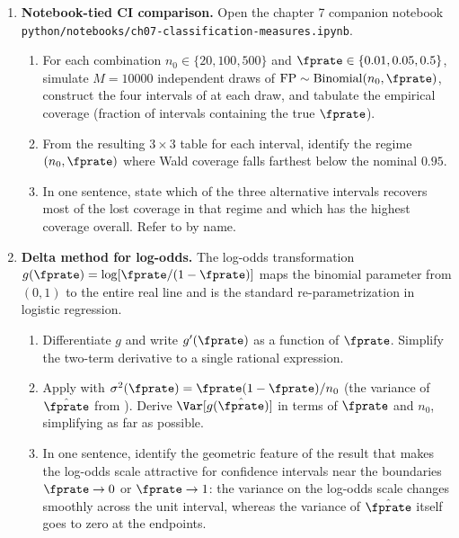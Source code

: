 \begin{enumerate}

\item \exstarstar
\label{ex:ch7-4}
\textbf{Notebook-tied CI comparison.}
Open the chapter 7 companion notebook
\texttt{python/notebooks/ch07-classification-measures.ipynb}.
\begin{enumerate}
  \item[(a)] For each combination $n_0 \in \{20, 100, 500\}$ and
    $\fprate \in \{0.01, 0.05, 0.5\}$, simulate $M = 10000$
    independent draws of $\mathrm{FP} \sim
    \mathrm{Binomial}(n_0, \fprate)$, construct the four intervals
    of 
    at each draw, and tabulate the empirical coverage (fraction
    of intervals containing the true $\fprate$).
  \item[(b)] From the resulting $3 \times 3$ table for each
    interval, identify the regime $(n_0, \fprate)$ where Wald
    coverage falls farthest below the nominal $0.95$.
  \item[(c)] In one sentence, state which of the three alternative
    intervals recovers most of the lost coverage in that regime
    and which has the highest coverage overall. Refer to
    by name.
\end{enumerate}

\item \exstarstar
\label{ex:ch7-5}
\textbf{Delta method for log-odds.}
The log-odds transformation $g(\fprate) = \log[\fprate / (1 -
\fprate)]$ maps the binomial parameter from $(0, 1)$ to the entire
real line and is the standard re-parametrization in logistic
regression.
\begin{enumerate}
  \item[(a)] Differentiate $g$ and write $g'(\fprate)$ as a function
    of $\fprate$. Simplify the two-term derivative to a single
    rational expression.
  \item[(b)] Apply  with $\sigma^2(\fprate) =
    \fprate(1 - \fprate) / n_0$ (the variance of $\hat{\fprate}$
    from ). Derive
    $\Var[g(\hat{\fprate})]$ in terms of $\fprate$ and $n_0$,
    simplifying as far as possible.
  \item[(c)] In one sentence, identify the geometric feature of the
    result that makes the log-odds scale attractive for
    confidence intervals near the boundaries $\fprate \to 0$ or
    $\fprate \to 1$: the variance on the log-odds scale changes
    smoothly across the unit interval, whereas the variance of
    $\hat{\fprate}$ itself goes to zero at the endpoints.
\end{enumerate}


\end{enumerate}
